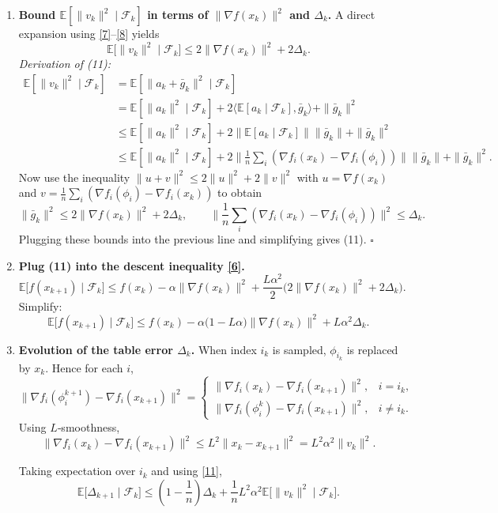 \documentclass{article}
\newcommand{\E}{\mathbb{E}}
\begin{document}
\begin{enumerate}
\item[Step 6.] \textbf{Bound $\E[\|v_k\|^{2}\mid\mathcal{F}_k]$ in terms of $\|\nabla f(x_k)\|^{2}$ and $\Delta_k$.}
A direct expansion using \eqref{7}–\eqref{8} yields
\[
\E\!\big[\|v_k\|^{2}\mid\mathcal{F}_k\big]
\le 2\|\nabla f(x_k)\|^{2}+2\Delta_k.
\tag{11}
\]
\emph{Derivation of (11):}
\begin{align*}
\E[\|v_k\|^{2}\mid\mathcal{F}_k]
&= \E[\|a_k+\bar g_k\|^{2}\mid\mathcal{F}_k] \\
&= \E[\|a_k\|^{2}\mid\mathcal{F}_k]+2\langle\E[a_k\mid\mathcal{F}_k],\bar g_k\rangle+\|\bar g_k\|^{2}\\
&\le \E[\|a_k\|^{2}\mid\mathcal{F}_k]+2\Big\|\E[a_k\mid\mathcal{F}_k]\Big\|\|\bar g_k\|
+\|\bar g_k\|^{2} \\
&\le \E[\|a_k\|^{2}\mid\mathcal{F}_k]+2\Big\|\frac1n\sum_i(\nabla f_i(x_k)-\nabla f_i(\phi_i))\Big\|
\|\bar g_k\|+\|\bar g_k\|^{2}.
\end{align*}
Now use the inequality $\|u+v\|^{2}\le 2\|u\|^{2}+2\|v\|^{2}$ with
$u=\nabla f(x_k)$ and $v=\frac1n\sum_i(\nabla f_i(\phi_i)-\nabla f_i(x_k))$ to obtain
\[
\|\bar g_k\|^{2}\le 2\|\nabla f(x_k)\|^{2}+2\Delta_k,
\qquad
\Big\|\frac1n\sum_i(\nabla f_i(x_k)-\nabla f_i(\phi_i))\Big\|^{2}\le \Delta_k.
\]
Plugging these bounds into the previous line and simplifying gives (11). \hfill $\square$

\item[Step 7.] \textbf{Plug (11) into the descent inequality \eqref{6}.}
\[
\E\!\big[f(x_{k+1})\mid\mathcal{F}_k\big]
\le f(x_k)-\alpha\|\nabla f(x_k)\|^{2}
+\frac{L\alpha^{2}}{2}\big(2\|\nabla f(x_k)\|^{2}+2\Delta_k\big).
\]
Simplify:
\[
\E\!\big[f(x_{k+1})\mid\mathcal{F}_k\big]
\le f(x_k)-\alpha\big(1-L\alpha\big)\|\nabla f(x_k)\|^{2}
+L\alpha^{2}\Delta_k.
\tag{12}
\]

\item[Step 8.] \textbf{Evolution of the table error $\Delta_k$.}
When index $i_k$ is sampled, $\phi_{i_k}$ is replaced by $x_k$.
Hence for each $i$,
\[
\|\nabla f_i(\phi_i^{k+1})-\nabla f_i(x_{k+1})\|^{2}
=
\begin{cases}
\|\nabla f_i(x_k)-\nabla f_i(x_{k+1})\|^{2}, & i=i_k,\\[4pt]
\|\nabla f_i(\phi_i^{k})-\nabla f_i(x_{k+1})\|^{2}, & i\neq i_k .
\end{cases}
\]
Using $L$‑smoothness,
\[
\|\nabla f_i(x_k)-\nabla f_i(x_{k+1})\|^{2}
\le L^{2}\|x_k-x_{k+1}\|^{2}=L^{2}\alpha^{2}\|v_k\|^{2}.
\tag{13}
\]

Taking expectation over $i_k$ and using \eqref{11},
\[
\E\!\big[\Delta_{k+1}\mid\mathcal{F}_k\big]
\le\left(1-\frac{1}{n}\right)\Delta_k
+\frac{1}{n}L^{2}\alpha^{2}\E\!\big[\|v_k\|^{2}\mid\mathcal{F}_k\big].
\tag{14}
\]


\end{enumerate}
\end{document}
